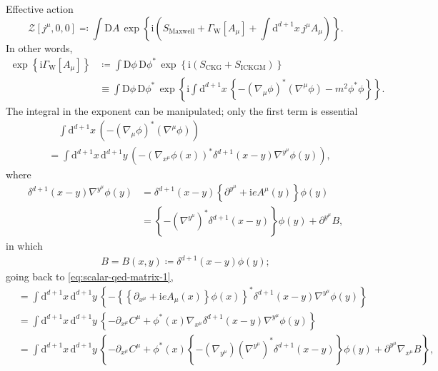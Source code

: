 \documentclass[12pt]{article}
\newcommand\mi{\mathrm{i}} %
\newcommand\dif{\mathrm{d}}
\newcommand\Dif{\mathrm{D}}
\newcommand{\rbr}[1]{{\left(#1\right)}}
\newcommand{\cbr}[1]{{\left\{#1\right\}}}
\newcommand{\rfun}[2]{{#1}\mathopen{}\left(#2\right)\mathclose{}}
\newcommand{\sfun}[2]{{#1}\mathopen{}\left[#2\right]\mathclose{}}
\newcommand{\cfun}[2]{{#1}\mathopen{}\left\{#2\right\}\mathclose{}}
\begin{document}
Effective action
\begin{equation}
\sfun{\mathcal{Z}}{j^\mu, 0, 0} \eqqcolon
\int\Dif A\,\cfun{\exp}{\mi\rbr{S_\text{Maxwell} + 
\sfun{\varGamma_\text{W}}{A_\mu}
+\int\dif^{d+1} x \,j^\mu A_\mu}}.
\end{equation}
In other words,
\begin{align}
\cfun{\exp}{\mi\sfun{\varGamma_\text{W}}{A_\mu}} &\coloneqq 
\int\Dif\phi\,\Dif\phi^*\,
\cfun{\exp}{\mi\rbr{S_\text{CKG}+S_\text{ICKGM}}}
\nonumber \\
&\equiv  \int\Dif\phi\,\Dif\phi^*\,
\cfun{\exp}{\mi\int\dif^{d+1}x\,\cbr{-\rbr{\nabla_\mu\phi}^* 
\rbr{\nabla^\mu\phi} - m^2\phi^*\phi}}.
\label{eq:scalar-qed-to-be-manipulated}
\end{align}
The integral in the exponent can be manipulated; only the first term is 
essential
\begin{align}
&\quad\int\dif^{d+1}x\,\rbr{-\rbr{\nabla_\mu\phi}^* \rbr{\nabla^\mu\phi}} 
\nonumber \\
&= \int\dif^{d+1}x\,\dif^{d+1}y\,\rbr{
-\rbr{\nabla_{x^\mu}\rfun{\phi}{x}}^* \rfun{\delta^{d+1}}{x-y}
\nabla^{y^\mu}\rfun{\phi}{y}},
\label{eq:scalar-qed-matrix-1}
\end{align}
where
\begin{align}
\rfun{\delta^{d+1}}{x-y} \nabla^{y^\mu}\rfun{\phi}{y}
&= \rfun{\delta^{d+1}}{x-y}
\cbr{\partial^{y^\mu}+\mi e \rfun{A^\mu}{y}}\rfun{\phi}{y} \nonumber \\
&= \cbr{-\rbr{\nabla^{y^\mu}}^*\rfun{\delta^{d+1}}{x-y}}\rfun{\phi}{y}
+\partial^{y^\mu}B,
\end{align}
in which
\begin{align}
B = \rfun{B}{x,y} \coloneqq \rfun{\delta^{d+1}}{x-y}\rfun{\phi}{y};
\end{align}
going back to \cref{eq:scalar-qed-matrix-1},
\begin{align}
&= \int\dif^{d+1}x\,\dif^{d+1}y\,\cbr{
-\cbr{\cbr{\partial_{x^\mu}+\mi e \rfun{A_\mu}{x}}\rfun{\phi}{x}}^* 
\rfun{\delta^{d+1}}{x-y} \nabla^{y^\mu}\rfun{\phi}{y}}
\nonumber \\
&= \int\dif^{d+1}x\,\dif^{d+1}y\,\cbr{ -\partial_{x^\mu} C^\mu + 
\rfun{\phi^*}{x}
\nabla_{x^\mu}
\rfun{\delta^{d+1}}{x-y} \nabla^{y^\mu}\rfun{\phi}{y}} \nonumber \\
&= \int\dif^{d+1}x\,\dif^{d+1}y\,\cbr{ -\partial_{x^\mu} C^\mu + 
\rfun{\phi^*}{x}
\cbr{-\rbr{\nabla_{y^\mu}}\rbr{\nabla^{y^\mu}}^*\rfun{\delta^{d+1}}{x-y}}
\rfun{\phi}{y} + \partial^{y^\mu}\nabla_{x^\mu} B},
\end{align}
\end{document}
